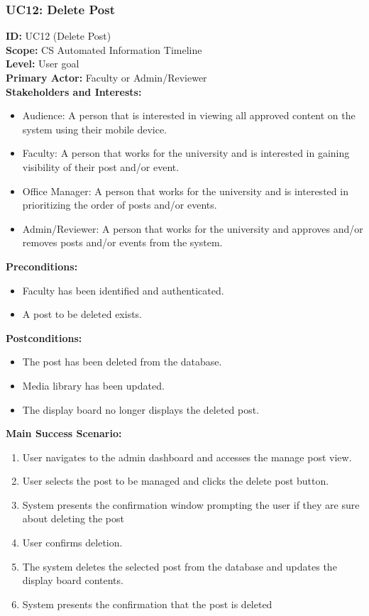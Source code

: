 \documentclass{article}
\begin{document}
\subsubsection{UC12: Delete Post}
\textbf{ID:} UC12 (Delete Post) \\
\textbf{Scope:} CS Automated Information Timeline \\
\textbf{Level:} User goal \\
\textbf{Primary Actor:} Faculty or Admin/Reviewer \\
\textbf{Stakeholders and Interests: }
\begin{itemize}
    \item Audience: A person that is interested in viewing all approved content on the system using their mobile device.
    \item Faculty: A person that works for the university and is interested in gaining visibility of their post and/or event.
    \item Office Manager: A person that works for the university and is interested in prioritizing the order of posts and/or events.
    \item Admin/Reviewer: A person that works for the university and approves and/or removes posts and/or events from the system.
\end{itemize}
\textbf{Preconditions:}
\begin{itemize}
    \item Faculty has been identified and authenticated.
    \item A post to be deleted exists.
\end{itemize}
\textbf{Postconditions:}
\begin{itemize}
    \item The post has been deleted from the database.
    \item Media library has been updated.
    \item The display board no longer displays the deleted post.
\end{itemize}
\textbf{Main Success Scenario: }
\begin{enumerate}
    \item User navigates to the admin dashboard and accesses the manage post view.
    \item User selects the post to be managed and clicks the delete post button.
    \item System presents the confirmation window prompting the user if they are sure about deleting the post
    \item User confirms deletion.
    \item The system deletes the selected post from the database and updates the display board contents.
    \item System presents the confirmation that the post is deleted
\end{enumerate}
\end{document}
